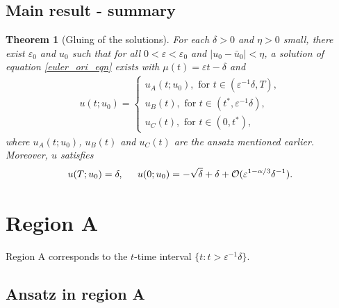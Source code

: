 \documentclass[letterpaper,11pt]{article}
\newcommand{\rmO}{\mathcal{O}}
\newcommand{\eps}{\varepsilon}
\numberwithin{equation}{section}
\theoremstyle{plain}
\newtheorem{theorem}{Theorem}[section]
\begin{document}
\subsection{Main result - summary} \label{main_sum}

\begin{theorem}[Gluing of the solutions]
For each $\delta>0$ and $\eta>0$ small, there exist $\eps_0$ and $u_0$ such that for all $0<\eps<\eps_0$ and $|u_0 - \bar{u}_0|<\eta$, a solution of equation \ref{euler_ori_eqn} exists with $\mu(t) = \eps t - \delta$ and 
\begin{align*}
u(t; u_0)  =\begin{cases}
u_A(t;u_0) , \text{ for }t \in (\eps^{-1}\delta, T),\\
u_B(t), \text{ for } t \in (t^*,\eps^{-1}\delta), \\
u_C(t), \text{ for } t \in (0, t^*),
\end{cases}
\end{align*}
where $u_A(t; u_0)$, $u_B(t)$ and $u_C(t)$ are the ansatz mentioned earlier. Moreover, $u$ satisfies 
\[
u(T;u_0) = \delta, \hspace{0.2in} u(0;u_0)  = -\sqrt{\delta} +\delta + \rmO( \eps^{1-\alpha/3}\delta^{-1}).
\]
\end{theorem}

\pagebreak



\section{Region A}\label{sec_A}

Region A corresponds to the $t$-time interval $\{ t : t > \eps^{-1}\delta\}$.

\subsection{Ansatz in region A}
\end{document}
